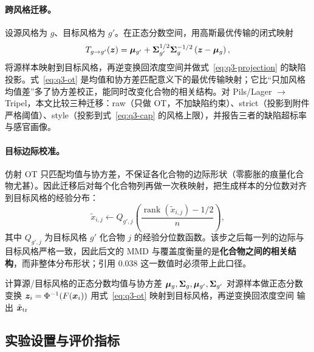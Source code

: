 \paragraph{跨风格迁移。}设源风格为 $g$、目标风格为 $g'$。在正态分数空间，用高斯最优传输的闭式映射
\begin{equation}
  T_{g\to g'}(\bm{z})=\bm{\mu}_{g'}+\bm{\Sigma}_{g'}^{1/2}\bm{\Sigma}_g^{-1/2}\left(\bm{z}-\bm{\mu}_g\right),
  \label{eq:q3-ot}
\end{equation}
将源样本映射到目标风格，再逆变换回浓度空间并做式~\eqref{eq:q3-projection} 的缺陷投影。式~\eqref{eq:q3-ot} 是均值和协方差匹配意义下的最优传输映射；它比“只加风格均值差”多了协方差校正，能同时改变化合物的相关结构。对 Pils/Lager $\to$ Tripel，本文比较三种迁移：raw（只做 OT，不加缺陷约束）、strict（投影到附件严格阈值）、style（投影到式~\eqref{eq:q3-cap} 的风格上限），并报告三者的缺陷超标率与感官画像。

\paragraph{目标边际校准。}仿射 OT 只匹配均值与协方差，不保证各化合物的边际形状（零膨胀的痕量化合物尤甚）。因此迁移后对每个化合物列再做一次秩映射，把生成样本的分位数对齐到目标风格的经验分布：
\begin{equation}
  \tilde{x}_{i,j}\leftarrow Q_{g',j}\!\left(\frac{\operatorname{rank}(\tilde{x}_{i,j})-1/2}{n}\right),
  \label{eq:q3-rank}
\end{equation}
其中 $Q_{g',j}$ 为目标风格 $g'$ 化合物 $j$ 的经验分位数函数。该步之后每一列的边际与目标风格严格一致，因此后文的 MMD 与覆盖度衡量的是\textbf{化合物之间的相关结构}，而非整体分布形状；引用 $0.038$ 这一数值时必须带上此口径。

\begin{algorithm}[htbp]
  \small
  \caption{缺陷约束的最优传输风格迁移}
  \label{alg:transfer}
  计算源/目标风格的正态分数均值与协方差 $\bm{\mu}_g,\bm{\Sigma}_g,\bm{\mu}_{g'},\bm{\Sigma}_{g'}$\;
  对源样本做正态分数变换 $\bm{z}_i=\Phi^{-1}(F(\bm{x}_i))$\;
  用式~\eqref{eq:q3-ot} 映射到目标风格，再逆变换回浓度空间\;
  输出 $\tilde{\bm{x}}_{\mathrm{tr}}$\;
\end{algorithm}

\subsection{实验设置与评价指标}


